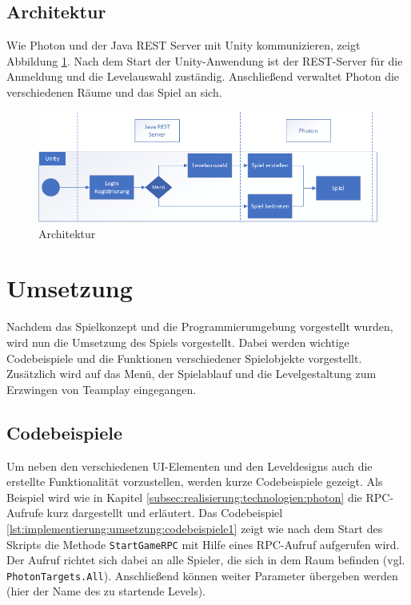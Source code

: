 \subsection{Architektur}
\label{subsec:realisierung:technologien:architektur}
Wie Photon und der Java REST Server mit Unity kommunizieren, zeigt Abbildung \ref{fig:realisierung:technologien:architektur}. Nach dem Start der Unity-Anwendung ist der REST-Server für die Anmeldung und die Levelauswahl zuständig. Anschließend verwaltet Photon die verschiedenen Räume und das Spiel an sich.

\begin{figure}[H]
    \begin{center}
      \includegraphics[width=\linewidth]{img/realisierung/Architektur}
      \caption{Architektur}
      \label{fig:realisierung:technologien:architektur}
    \end{center}
\end{figure}


\section{Umsetzung}
\label{sec:grundlagen:umsetzung}
Nachdem das Spielkonzept und die Programmierumgebung vorgestellt wurden, wird nun die Umsetzung des Spiels vorgestellt. Dabei werden wichtige Codebeispiele und die Funktionen verschiedener Spielobjekte vorgestellt. Zusätzlich wird auf das Menü, der Spielablauf und die Levelgestaltung zum Erzwingen von Teamplay eingegangen.

\subsection{Codebeispiele}
\label{subsec:implementierung:umsetzung:codebeispiele}
Um neben den verschiedenen UI-Elementen und den Leveldesigns auch die erstellte Funktionalität vorzustellen, werden kurze Codebeispiele gezeigt. Als Beispiel wird wie in Kapitel \ref{subsec:realisierung:technologien:photon} die RPC-Aufrufe kurz dargestellt und erläutert. Das Codebeispiel \ref{lst:implementierung:umsetzung:codebeispiele1} zeigt wie nach dem Start des Skripts die Methode \texttt{StartGameRPC} mit Hilfe eines RPC-Aufruf aufgerufen wird. Der Aufruf richtet sich dabei an alle Spieler, die sich in dem Raum befinden (vgl. \texttt{PhotonTargets.All}). Anschließend können weiter Parameter übergeben werden (hier der Name des zu startende Levels).

